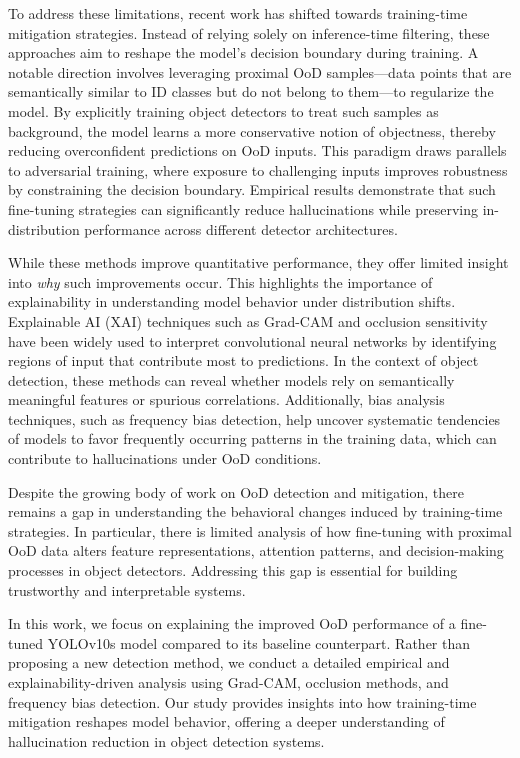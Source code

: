 To address these limitations, recent work has shifted towards training-time mitigation strategies.
Instead of relying solely on inference-time filtering, these approaches aim to reshape the model's decision boundary during training.
A notable direction involves leveraging proximal OoD samples---data points that are semantically similar to ID classes but do not belong to them---to regularize the model.
By explicitly training object detectors to treat such samples as background, the model learns a more conservative notion of objectness, thereby reducing overconfident predictions on OoD inputs.
This paradigm draws parallels to adversarial training, where exposure to challenging inputs improves robustness by constraining the decision boundary.
Empirical results demonstrate that such fine-tuning strategies can significantly reduce hallucinations while preserving in-distribution performance across different detector architectures.

While these methods improve quantitative performance, they offer limited insight into \textit{why} such improvements occur.
This highlights the importance of explainability in understanding model behavior under distribution shifts.
Explainable AI (XAI) techniques such as Grad-CAM and occlusion sensitivity have been widely used to interpret convolutional neural networks by identifying regions of input that contribute most to predictions.
In the context of object detection, these methods can reveal whether models rely on semantically meaningful features or spurious correlations.
Additionally, bias analysis techniques, such as frequency bias detection, help uncover systematic tendencies of models to favor frequently occurring patterns in the training data, which can contribute to hallucinations under OoD conditions.

Despite the growing body of work on OoD detection and mitigation, there remains a gap in understanding the behavioral changes induced by training-time strategies.
In particular, there is limited analysis of how fine-tuning with proximal OoD data alters feature representations, attention patterns, and decision-making processes in object detectors.
Addressing this gap is essential for building trustworthy and interpretable systems.

In this work, we focus on explaining the improved OoD performance of a fine-tuned YOLOv10s model compared to its baseline counterpart.
Rather than proposing a new detection method, we conduct a detailed empirical and explainability-driven analysis using Grad-CAM, occlusion methods, and frequency bias detection.
Our study provides insights into how training-time mitigation reshapes model behavior, offering a deeper understanding of hallucination reduction in object detection systems.

